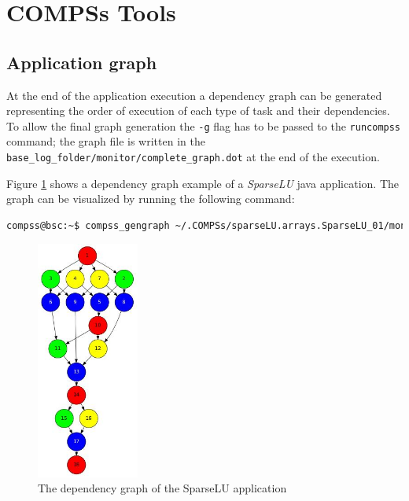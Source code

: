 \section{COMPSs Tools}
\label{sec:Tools}

\subsection{Application graph}
At the end of the application execution a dependency graph can be generated representing the order of execution of each type of 
task and their dependencies. To allow the final graph generation the \texttt{-g} flag has to be passed to the \texttt{runcompss} command; the graph file is written in the \texttt{base\_log\_folder/monitor/complete\_graph.dot} at the end of the execution.

Figure \ref{fig:complete_graph} shows a dependency graph example of a \textit{SparseLU} java application. The graph can be
visualized by running the following command:
\begin{lstlisting}[language=bash]
compss@bsc:~$ compss_gengraph ~/.COMPSs/sparseLU.arrays.SparseLU_01/monitor/complete_graph.dot
\end{lstlisting}

\begin{figure}[h!]
  \centering
    \includegraphics[width=0.3\textwidth]{./Sections/4_Tools/Figures/dependency_graph.jpeg}
    \caption{The dependency graph of the SparseLU application}
    \label{fig:complete_graph}
\end{figure}



